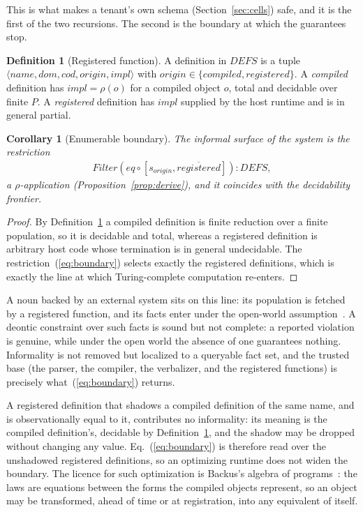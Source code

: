 \documentclass[10pt,twocolumn]{article}
\theoremstyle{plain}
\newtheorem{corollary}{Corollary}
\theoremstyle{definition}
\newtheorem{definition}{Definition}
\begin{document}
\noindent This is what makes a tenant's own schema (Section~\ref{sec:cells}) safe, and it is the first of the two recursions. The second is the boundary at which the guarantees stop.

\begin{definition}[Registered function]\label{def:reg}
A definition in $\mathit{DEFS}$ is a tuple $\langle\mathit{name},\mathit{dom},\mathit{cod},\mathit{origin},\mathit{impl}\rangle$ with $\mathit{origin}\in\{\mathit{compiled},\mathit{registered}\}$. A \emph{compiled} definition has $\mathit{impl}=\rho(o)$ for a compiled object $o$, total and decidable over finite $P$. A \emph{registered} definition has $\mathit{impl}$ supplied by the host runtime and is in general partial.
\end{definition}

\begin{corollary}[Enumerable boundary]\label{cor:boundary}
The informal surface of the system is the restriction
\begin{align}
\mathit{Filter}(\mathit{eq}\circ[s_{\mathit{origin}},\overline{\mathit{registered}}])\!:\!\mathit{DEFS}, \label{eq:boundary}
\end{align}
a $\rho$-application (Proposition~\ref{prop:derive}), and it coincides with the decidability frontier.
\end{corollary}
\begin{proof}
By Definition~\ref{def:reg} a compiled definition is finite reduction over a finite population, so it is decidable and total, whereas a registered definition is arbitrary host code whose termination is in general undecidable. The restriction~(\ref{eq:boundary}) selects exactly the registered definitions, which is exactly the line at which Turing-complete computation re-enters.
\end{proof}

\noindent A noun backed by an external system sits on this line: its population is fetched by a registered function, and its facts enter under the open-world assumption~\cite{halpin08}. A deontic constraint over such facts is sound but not complete: a reported violation is genuine, while under the open world the absence of one guarantees nothing. Informality is not removed but localized to a queryable fact set, and the trusted base (the parser, the compiler, the verbalizer, and the registered functions) is precisely what~(\ref{eq:boundary}) returns.

\smallskip\noindent A registered definition that shadows a compiled definition of the same name, and is observationally equal to it, contributes no informality: its meaning is the compiled definition's, decidable by Definition~\ref{def:reg}, and the shadow may be dropped without changing any value. Eq.~(\ref{eq:boundary}) is therefore read over the unshadowed registered definitions, so an optimizing runtime does not widen the boundary. The licence for such optimization is Backus's algebra of programs~\cite[Sec.\,12.2]{backus78}: the laws are equations between the forms the compiled objects represent, so an object may be transformed, ahead of time or at registration, into any equivalent of itself.
\end{document}
